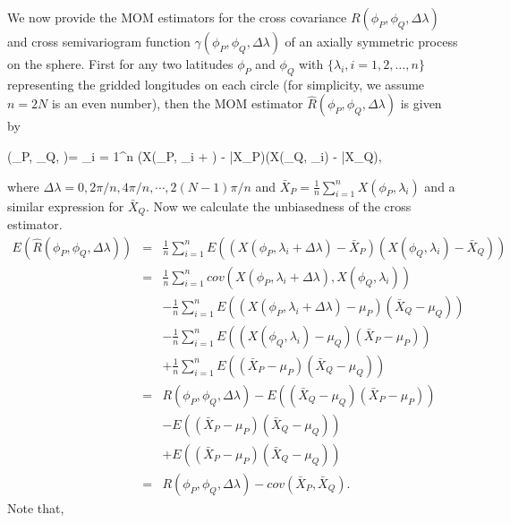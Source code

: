 We now provide the MOM estimators for the cross covariance $R(\phi_P, \phi_Q, \Delta \lambda)$ and cross semivariogram function $\gamma(\phi_P, \phi_Q, \Delta \lambda)$ of an axially symmetric process on the sphere. First for any two latitudes $\phi_P$ and $\phi_Q$ with $\{\lambda_i, i = 1, 2, \ldots, n\}$ representing the gridded longitudes on each circle (for simplicity, we assume $n = 2N$ is an even number), then the MOM estimator $\hat{R}(\phi_P, \phi_Q, \Delta \lambda)$ is given by
					

\beq \label{cross_covariance}
(\phi_P, \phi_Q, \Delta \lambda)= \sum_{i = 1}^n (X(\phi_P, \lambda_i + \Delta \lambda) - \bar{X}_P)(X(\phi_Q, \lambda_i) - \bar{X}_Q),
\eeq

\noi where $\Delta \lambda = 0, 2\pi/n, 4\pi/n, \cdots, 2(N-1)\pi/n$ and $\bar{X}_P = \frac{1}{n}\sum_{i=1}^n X(\phi_P, \lambda_i)$ and a similar expression for $\bar{X}_Q$. Now we calculate the unbiasedness of the cross \cov estimator.	
\begin{eqnarray*}
				E(\hat{R}(\phi_P, \phi_Q, \Delta \lambda)) &=& \frac{1}{n}\sum_{i = 1}^n E((X(\phi_P, \lambda_i + \Delta \lambda) - \bar{X}_P)(X(\phi_Q, \lambda_i) - \bar{X}_Q)) \\
				&=& \frac{1}{n}\sum_{i=1}^n cov(X(\phi_P, \lambda_i+\Delta \lambda), X(\phi_Q, \lambda_i)) \\
				& & - \frac{1}{n}\sum_{i = 1}^n E((X(\phi_P, \lambda_i + \Delta \lambda) - \mu_P)(\bar{X}_Q - \mu_Q)) \\
				& & -\frac{1}{n}\sum_{i = 1}^n E((X(\phi_Q, \lambda_i) - \mu_Q)(\bar{X}_P - \mu_P)) \\
				& & + \frac{1}{n}\sum_{i = 1}^n E((\bar{X}_P - \mu_P)(\bar{X}_Q - \mu_Q)) \\
				&=& R(\phi_P, \phi_Q, \Delta \lambda) -E((\bar{X}_Q - \mu_Q)(\bar{X}_P - \mu_P)) \\
				& & - E((\bar{X}_P - \mu_P)(\bar{X}_Q - \mu_Q)) \\
				& & + E((\bar{X}_P - \mu_P)(\bar{X}_Q - \mu_Q)) \\
				&=& R(\phi_P, \phi_Q, \Delta \lambda) - cov(\bar{X}_P, \bar{X}_Q).
\end{eqnarray*}
Note that,
